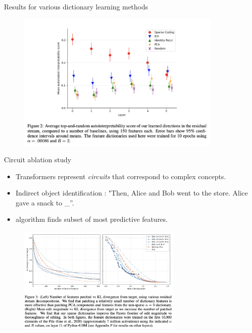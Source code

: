 \begin{frame}{Results for various dictionary learning methods}
\begin{figure}
    \includegraphics[width=10cm]{img/figure2.png}
    \caption*{\citet{Cunningham2023-mu}}
\end{figure}
\end{frame}

\begin{frame}{Circuit ablation study}
\begin{itemize}
\item Transformers represent {\it circuits} that correspond to complex concepts.
\item Indirect object identification \citep{Wang2022-yo}: "Then, Alice and Bob went to the store. Alice
gave a snack to \_”.
\item \citet{Conmy-undated-os} algorithm finds subset of most predictive features.
\end{itemize}
\begin{figure}
    \includegraphics[width=8cm]{img/klresults.png}
\end{figure}
\end{frame}